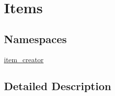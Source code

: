 \hypertarget{group__items}{\section{Items}
\label{group__items}
}
\subsection*{Namespaces}
\begin{DoxyCompactItemize}
\item 
\hyperlink{namespaceitem__creator}{item\-\_\-creator}
\end{DoxyCompactItemize}


\subsection{Detailed Description}
